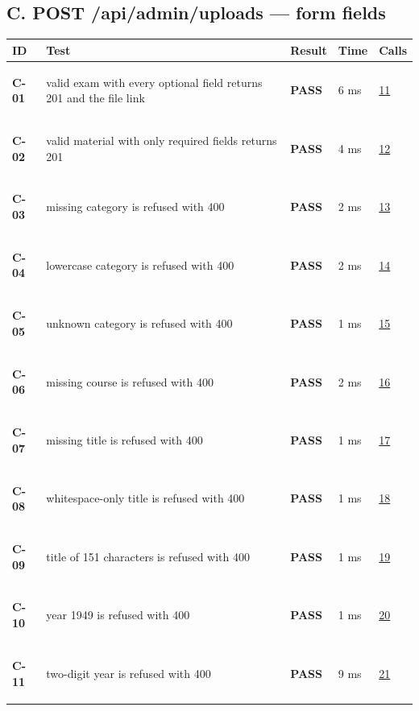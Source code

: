 \documentclass[10pt,a4paper]{article}
\begin{document}
\subsection*{C. POST /api/admin/uploads — form fields}
\begin{longtable}{@{}P{1.2cm}P{9.2cm}P{1.2cm}P{1.3cm}P{2.4cm}@{}}
\toprule \textbf{ID} & \textbf{Test} & \textbf{Result} & \textbf{Time} & \textbf{Calls} \\ \midrule \endhead
\hypertarget{test-C-01}{\textbf{C-01}} & valid exam with every optional field returns 201 and the file link & \textcolor{passgreen}{\textbf{PASS}} & 6 ms & \hyperlink{call11}{11} \\
\hypertarget{test-C-02}{\textbf{C-02}} & valid material with only required fields returns 201 & \textcolor{passgreen}{\textbf{PASS}} & 4 ms & \hyperlink{call12}{12} \\
\hypertarget{test-C-03}{\textbf{C-03}} & missing category is refused with 400 & \textcolor{passgreen}{\textbf{PASS}} & 2 ms & \hyperlink{call13}{13} \\
\hypertarget{test-C-04}{\textbf{C-04}} & lowercase category is refused with 400 & \textcolor{passgreen}{\textbf{PASS}} & 2 ms & \hyperlink{call14}{14} \\
\hypertarget{test-C-05}{\textbf{C-05}} & unknown category is refused with 400 & \textcolor{passgreen}{\textbf{PASS}} & 1 ms & \hyperlink{call15}{15} \\
\hypertarget{test-C-06}{\textbf{C-06}} & missing course is refused with 400 & \textcolor{passgreen}{\textbf{PASS}} & 2 ms & \hyperlink{call16}{16} \\
\hypertarget{test-C-07}{\textbf{C-07}} & missing title is refused with 400 & \textcolor{passgreen}{\textbf{PASS}} & 1 ms & \hyperlink{call17}{17} \\
\hypertarget{test-C-08}{\textbf{C-08}} & whitespace-only title is refused with 400 & \textcolor{passgreen}{\textbf{PASS}} & 1 ms & \hyperlink{call18}{18} \\
\hypertarget{test-C-09}{\textbf{C-09}} & title of 151 characters is refused with 400 & \textcolor{passgreen}{\textbf{PASS}} & 1 ms & \hyperlink{call19}{19} \\
\hypertarget{test-C-10}{\textbf{C-10}} & year 1949 is refused with 400 & \textcolor{passgreen}{\textbf{PASS}} & 1 ms & \hyperlink{call20}{20} \\
\hypertarget{test-C-11}{\textbf{C-11}} & two-digit year is refused with 400 & \textcolor{passgreen}{\textbf{PASS}} & 9 ms & \hyperlink{call21}{21} \\

\end{longtable}
\end{document}
